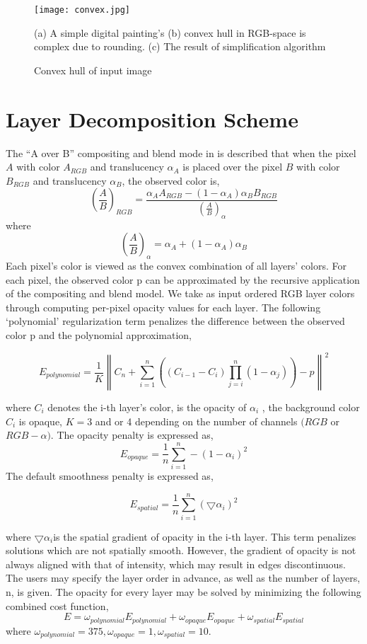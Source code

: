 \begin{figure}[H]
	\centering
	\texttt{[image: convex.jpg]}
	\caption{Convex hull of input image}
	\label{convex}
	\medskip
	\small
	(a) A simple digital painting’s (b) convex hull in RGB-space is complex due to rounding. (c) The result of simplification algorithm 
\end{figure}

\section{Layer Decomposition Scheme}


The “A over B” compositing and blend mode in \cite{porter1984compositing} is described that when the pixel $A$ with color $A_{RGB}$ and translucency $\alpha_{A}$ is placed over the pixel $B$ with color $B_{RGB}$ and translucency $\alpha_{B}$, the observed color is, 
\[  \left ( \frac{A}{B} \right )_{RGB}=\frac{\alpha_{A}A_{RGB}-(1-\alpha_{A})\alpha_{B}B_{RGB}}{\left ( \frac{A}{B} \right )_{\alpha}} \]
where 
\[\left ( \frac{A}{B} \right )_{\alpha} = \alpha_{A}+(1-\alpha_{A})\alpha_{B} \] 
Each pixel’s color is viewed as the convex combination of all layers’ colors. For each pixel, the observed color p can be approximated by the recursive application of the compositing and blend model. We take as input ordered RGB layer colors through computing per-pixel opacity values for each layer. The following ‘polynomial’ regularization term penalizes the difference between the observed color p and the polynomial approximation,

\[E_{polynomial}=\frac{1}{K}\left \|    C_{n}+\sum_{i=1}^{n}  \left ( \left ( C_{i-1}-C_{i} \right ) \prod_{j=i}^{n}(1-\alpha_{j}) \right )-p  \right \|^{2}\]

where $C_{i}$ denotes the i-th layer’s color, is the opacity of $\alpha_{i}$ , the background color $C_{i}$ is opaque, $K=3$ and or 4 depending on the number of channels $(RGB$ or $RGB-\alpha)$. The opacity penalty is expressed as,
\[E_{opaque}=\frac{1}{n}\sum_{i=1}^n-(1-\alpha_{i})^2\]
The default smoothness penalty is expressed as,

\[E_{spatial}=\frac{1}{n}\sum_{i=1}^n( \bigtriangledown  \alpha_{i})^2\]

where $ \bigtriangledown  \alpha_{i}$is the spatial gradient of opacity in the i-th layer. This term penalizes solutions which are not spatially smooth. However, the gradient of opacity is not always aligned with that of intensity, which may result in edges discontinuous.
The users may specify the layer order in advance, as well as the number of layers, n, is given. The opacity for every layer may be solved by minimizing the following combined cost function,
\begin{equation}
E=\omega_{polynomial}E_{polynomial}+\omega_{opaque}E_{opaque}+\omega_{spatial}E_{spatial}
\label{eq:layer1}
\end{equation} 
where $\omega_{polynomial} = 375 ,\omega_{opaque}=1 , \omega_{spatial}=10$. 


